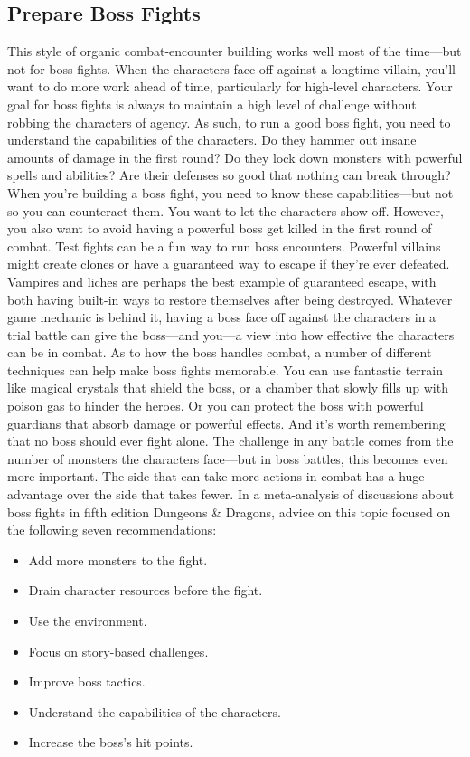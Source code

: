 \documentclass[10pt,a4paper,twoside,bg=print,twocolumn,openany,nodeprecatedcode]{dndbook}
\begin{document}
\subsection{Prepare Boss Fights}
This style of organic combat-encounter building works well most of the time—but not for boss fights. When the characters face off against a longtime villain, you'll want to do more work ahead of time, particularly for high-level characters.
Your goal for boss fights is always to maintain a high level of challenge without robbing the characters of agency. As such, to run a good boss fight, you need to understand the capabilities of the characters. Do they hammer out insane amounts of damage in the first round? Do they lock down monsters with powerful spells and abilities? Are their defenses so good that nothing can break through?
When you're building a boss fight, you need to know these capabilities—but not so you can counteract them. You want to let the characters show off. However, you also want to avoid having a powerful boss get killed in the first round of combat.
Test fights can be a fun way to run boss encounters. Powerful villains might create clones or have a guaranteed way to escape if they're ever defeated. Vampires and liches are perhaps the best example of guaranteed escape, with both having built-in ways to restore themselves after being destroyed. Whatever game mechanic is behind it, having a boss face off against the characters in a trial battle can give the boss—and you—a view into how effective the characters can be in combat.
As to how the boss handles combat, a number of different techniques can help make boss fights memorable. You can use fantastic terrain like magical crystals that shield the boss, or a chamber that slowly fills up with poison gas to hinder the heroes. Or you can protect the boss with powerful guardians that absorb damage or powerful effects. And it's worth remembering that no boss should ever fight alone. The challenge in any battle comes from the number of monsters the characters face—but in boss battles, this becomes even more important.
The side that can take more actions in combat has a huge advantage over the side that takes fewer. In a meta-analysis of discussions about boss fights in fifth edition Dungeons \& Dragons, advice on this topic focused on the following seven recommendations:

\begin{itemize}
\item Add more monsters to the fight.
\item Drain character resources before the fight.
\item Use the environment.
\item Focus on story-based challenges.
\item Improve boss tactics.
\item Understand the capabilities of the characters.
\item Increase the boss's hit points.
\end{itemize}
\end{document}
